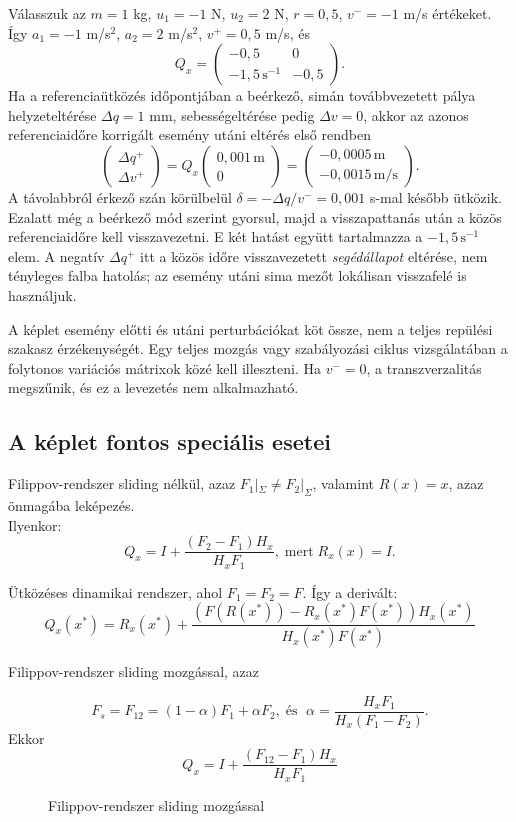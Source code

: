 Válasszuk az $m=1$ kg, $u_1=-1$ N, $u_2=2$ N, $r=0{,}5$, $v^-=-1$ m/s értékeket. Így $a_1=-1$ m/s$^2$, $a_2=2$ m/s$^2$, $v^+=0{,}5$ m/s, és
\[
Q_x=\begin{pmatrix}-0{,}5&0\\-1{,}5\,\mathrm{s}^{-1}&-0{,}5\end{pmatrix}.
\]
Ha a referenciaütközés időpontjában a beérkező, simán továbbvezetett pálya helyzeteltérése $\Delta q=1$ mm, sebességeltérése pedig $\Delta v=0$, akkor az azonos referenciaidőre korrigált esemény utáni eltérés első rendben
\[
\begin{pmatrix}\Delta q^+\\\Delta v^+\end{pmatrix}
=Q_x\begin{pmatrix}0{,}001\,\mathrm m\\0\end{pmatrix}
=\begin{pmatrix}-0{,}0005\,\mathrm m\\-0{,}0015\,\mathrm{m/s}\end{pmatrix}.
\]
A távolabbról érkező szán körülbelül $\delta=-\Delta q/v^-=0{,}001$ s-mal később ütközik. Ezalatt még a beérkező mód szerint gyorsul, majd a visszapattanás után a közös referenciaidőre kell visszavezetni. E két hatást együtt tartalmazza a $-1{,}5\,\mathrm{s}^{-1}$ elem. A negatív $\Delta q^+$ itt a közös időre visszavezetett \emph{segédállapot} eltérése, nem tényleges falba hatolás; az esemény utáni sima mezőt lokálisan visszafelé is használjuk.

A képlet esemény előtti és utáni perturbációkat köt össze, nem a teljes repülési szakasz érzékenységét. Egy teljes mozgás vagy szabályozási ciklus vizsgálatában a folytonos variációs mátrixok közé kell illeszteni. Ha $v^-=0$, a transzverzalitás megszűnik, és ez a levezetés nem alkalmazható.
\exampleend

\subsection*{A képlet fontos speciális esetei}
  Filippov-rendszer sliding nélkül, azaz $F_1|_\Sigma \neq F_2|_\Sigma$, valamint $R(x)=x$, azaz önmagába leképezés. \\
 Ilyenkor:
 \[Q_x=I+\frac{(F_2-F_1)H_x}{H_xF_1}, \; \text{mert} \; R_x(x)=I.\]
\exampleend

 Ütközéses dinamikai rendszer, ahol $F_1=F_2=F$.
Így a derivált:
\[
Q_x(x^*)=R_x(x^*)+\frac{(F(R(x^*))-R_x(x^*)F(x^*))H_x(x^*)}{H_x(x^*)F(x^*)}
\]
\exampleend

 Filippov-rendszer sliding mozgással, azaz

 \[
 F_s=F_{12}=(1-\alpha)F_1+\alpha F_2, \; \text{és } \; \alpha=\frac{H_x F_1}{H_x(F_1-F_2)}.
 \]
 Ekkor
\[
	Q_x=I+\frac{(F_{12}-F_1)H_x}{H_xF_1}
\]

\begin{figure}[ht]
	\centering
	
	\caption{Filippov-rendszer sliding mozgással}\label{fig:503}
\end{figure}
\exampleend

